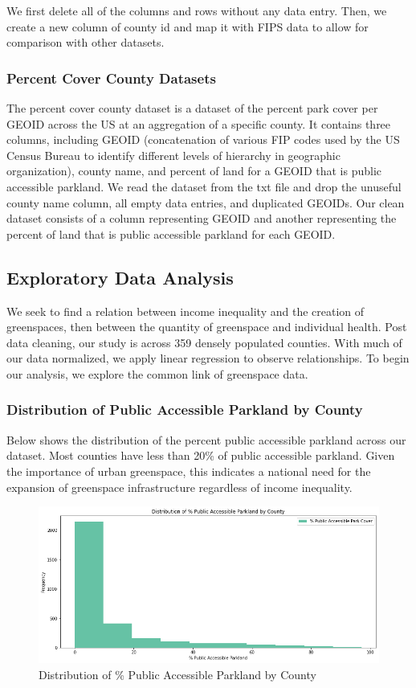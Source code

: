 \documentclass{article}
\begin{document}
We first delete all of the columns and rows without any data entry. Then, we create a new column of county id and map it with FIPS data to allow for comparison with other datasets.


\subsubsection{Percent Cover County Datasets}
The percent cover county dataset is a dataset of the percent park cover per GEOID across the US at an aggregation of a specific county. It contains three columns, including GEOID (concatenation of various FIP codes used by the US Census Bureau to identify different levels of hierarchy in geographic organization), county name, and percent of land for a GEOID that is public accessible parkland. We read the dataset from the txt file and drop the unuseful county name column, all empty data entries, and duplicated GEOIDs. Our clean dataset consists of a column representing GEOID and another representing the percent of land that is public accessible parkland for each GEOID.



\subsection{Exploratory Data Analysis}
We seek to find a relation between income inequality and the creation of greenspaces, then between the quantity of greenspace and individual health. Post data cleaning, our study is across 359 densely populated counties. With much of our data normalized, we apply linear regression to observe relationships. To begin our analysis, we explore the common link of greenspace data.


\subsubsection{Distribution of Public Accessible Parkland by County}

Below shows the distribution of the percent public accessible parkland across our dataset. Most counties have less than 20\% of public accessible parkland. Given the importance of urban greenspace, this indicates a national need for the expansion of greenspace infrastructure regardless of income inequality. 


\begin{figure}[H]
    \centering
    \includegraphics[scale = 0.4]{park.png}
    \caption{Distribution of \% Public Accessible Parkland by County}
    \label{fig:my_label}
\end{figure}
\end{document}
